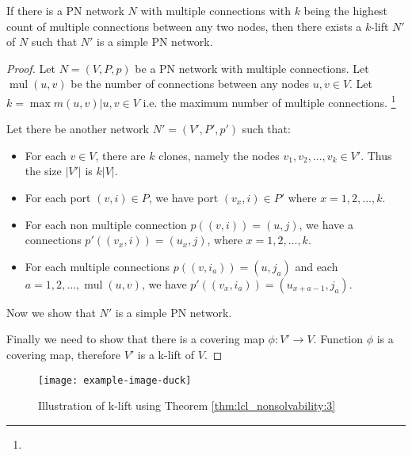 \begin{theorem} \label{thm:lcl_nonsolvability:3}
    If there is a PN network $N$ with multiple connections with $k$ being the highest count of multiple connections between any two nodes, then there exists a $k$-lift $N'$ of $N$ such that $N'$ is a simple PN network.
\end{theorem}
\begin{proof}
    Let $N=(V, P, p)$ be a PN network with multiple connections.
    Let $\operatorname{mul}(u, v)$ be the number of connections between any nodes $u, v \in V$.
    Let $k=\max {m(u, v) | u, v \in V}$ i.e. the maximum number of multiple connections.
    \footnote{}

    Let there be another network $N'=(V', P', p')$ such that:
    \begin{itemize}
        \item For each $v \in V$, there are $k$ clones, namely the nodes $v_1, v_2, ..., v_k \in V'$.
            Thus the size $|V'|$ is $k|V|$.
        \item For each port $(v, i) \in P$, we have port $(v_x, i) \in P'$ where $x=1, 2, ..., k$.
        \item For each non multiple connection $p((v, i)) = (u, j)$, we have a connections $p'((v_x, i)) = (u_x, j)$, where $x=1, 2, ..., k$.
        \item For each multiple connections $p((v, i_a)) = (u, j_a)$ and each $a = 1, 2, ..., \operatorname{mul}(u, v)$, we have $p'((v_{x}, i_a)) = (u_{x+a-1}, j_a)$.
    \end{itemize}

    Now we show that $N'$ is a simple PN network.

    Finally we need to show that there is a covering map $\phi: V' \rightarrow V$.
    Function $\phi$ is a covering map, therefore $V'$ is a k-lift of $V$.

\end{proof}

\begin{figure}[H]
 \centering
 \texttt{[image: example-image-duck]}
 \caption{Illustration of k-lift using Theorem \ref{thm:lcl_nonsolvability:3} }
 \label{fig:duck2}
\end{figure}

